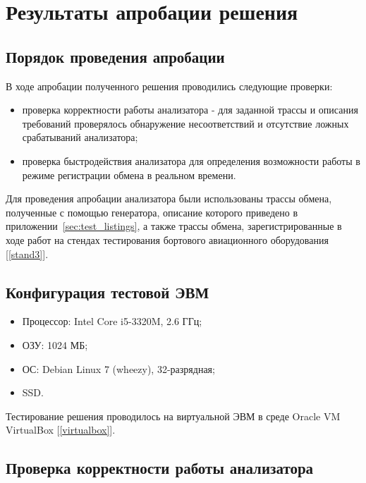\section{Результаты апробации решения}


\subsection{Порядок проведения апробации}

В ходе апробации полученного решения проводились следующие проверки:

\begin{itemize}
 \item проверка корректности работы анализатора - для заданной трассы и 
описания требований проверялось обнаружение несоответствий и отсутствие ложных 
срабатываний анализатора;
 \item проверка быстродействия анализатора для определения возможности работы в 
режиме регистрации обмена в реальном времени.
\end{itemize}

Для проведения апробации анализатора были использованы трассы обмена, 
полученные с помощью генератора, описание которого приведено в 
приложении~\ref{sec:test_listings}, а также трассы обмена, зарегистрированные 
в ходе работ на стендах тестирования бортового авиационного оборудования 
[\ref{stand3}].


\subsection{Конфигурация тестовой ЭВМ}
\label{subsec:test_stand}

\begin{itemize}
 \item Процессор: Intel Core i5-3320M, 2.6 ГГц;
 \item ОЗУ: 1024 МБ;
 \item ОС: Debian Linux 7 (wheezy), 32-разрядная;
 \item SSD. 
\end{itemize}

Тестирование решения проводилось на виртуальной ЭВМ в среде Oracle VM 
VirtualBox [\ref{virtualbox}].

\subsection{Проверка корректности работы анализатора}

